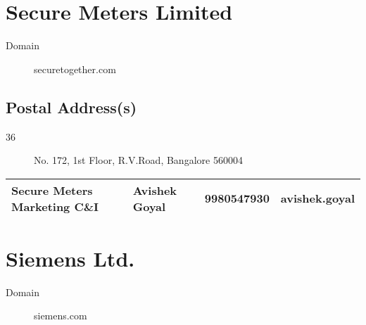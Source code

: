\documentclass[a4paper, 11pt, twoside]{book}
\begin{document}
\section{Secure Meters Limited}\label{com:27}
\begin{description}
\item[Domain]securetogether.com
\end{description}
\subsection*{Postal Address(s)}
\begin{description}
\item [36]No. 172, 1st Floor, R.V.Road, Bangalore 560004
\end{description}
\begin{tabular}{|p{4cm}|p{2cm}|p{2cm}|p{3cm}|}
\hline
Secure Meters Marketing C\&I & Avishek Goyal & 9980547930 & avishek.goyal \\ \hline
\end{tabular}
\section{Siemens Ltd.}\label{com:15}
\begin{description}
\item[Domain]siemens.com
\end{description}
\end{document}
